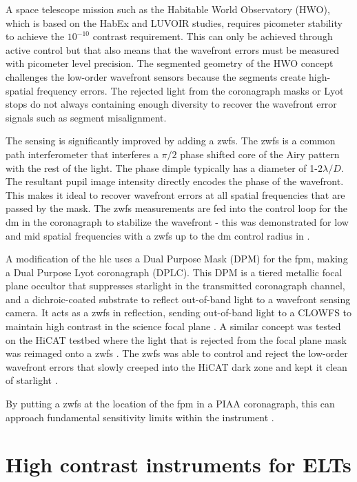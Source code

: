 \documentclass[letterpaper]{ar-1col}
\newcommand{\ld}{$\lambda/D$}
\begin{document}
A space telescope mission such as the Habitable World Observatory (HWO), which is based on the HabEx and LUVOIR studies, requires picometer stability to achieve the $10^{-10}$ contrast requirement.
%
This can only be achieved through active control but that also means that the wavefront errors must be measured with picometer level precision.
%
The segmented geometry of the HWO concept challenges the low-order wavefront sensors because the segments create high-spatial frequency errors.
%
The rejected light from the coronagraph masks or Lyot stops do not always containing enough diversity to recover the wavefront error signals such as segment misalignment.

The sensing is significantly improved by adding a \ac{zwfs}. The \ac{zwfs} is a common path interferometer that interferes a $\pi/2$ phase shifted core of the Airy pattern with the rest of the light.
%
The phase dimple typically has a diameter of 1-2\ld{}.
%
The resultant pupil image intensity directly encodes the phase of the wavefront.
%
This makes it ideal to recover wavefront errors at all spatial frequencies that are passed by the mask.
%
The \ac{zwfs} measurements are fed into the control loop for the \ac{dm} in the coronagraph to stabilize the wavefront - this was demonstrated for low and mid spatial frequencies with a \ac{zwfs} up to the \ac{dm} control radius in \citet{Ruane20}.

A modification of the \ac{hlc} uses a Dual Purpose Mask (DPM) for the \ac{fpm}, making a Dual Purpose Lyot coronagraph (DPLC).
%
This DPM is a tiered metallic focal plane occultor that suppresses starlight in the transmitted coronagraph channel, and a dichroic-coated substrate to reflect out-of-band light to a wavefront sensing camera.
%
It acts as a \ac{zwfs} in reflection, sending out-of-band light to a CLOWFS to maintain high contrast in the science focal plane \citep{Ruane23}.
%
A similar concept was tested on the HiCAT testbed where the light that is rejected from the focal plane mask was reimaged onto a \ac{zwfs} \citep{Pourcelot22,Pourcelot23}.
%
The \ac{zwfs} was able to control and reject the low-order wavefront errors that slowly creeped into the HiCAT dark zone and kept it clean of starlight \citep{Soummer22}.

By putting a \ac{zwfs} at the location of the \ac{fpm} in a PIAA coronagraph, this can approach fundamental sensitivity limits within the instrument \citep{Haffert23}.

\section{High contrast instruments for ELTs}
\end{document}
